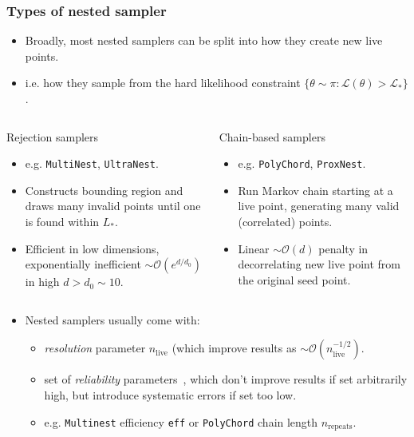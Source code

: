 \documentclass[aspectratio=169]{beamer}
\begin{document}
\begin{frame}
    \frametitle{Types of nested sampler}
    \begin{itemize}
        \item Broadly, most nested samplers can be split into how they create new live points.
        \item i.e. how they sample from the hard likelihood constraint $\{\theta\sim \pi : \mathcal{L}(\theta)>\mathcal{L}_* \}$.
    \end{itemize}
    \vspace{-10pt}
    \begin{columns}[t]
        \begin{block}{Rejection samplers}
            \begin{itemize}
                \item e.g. \texttt{MultiNest}, \texttt{UltraNest}.
                \item Constructs bounding region and draws many invalid points until one is found within $L_*$.
                \item Efficient in low dimensions, exponentially inefficient $\sim\mathcal{O}(e^{d/d_0})$ in high  $d>d_0\sim10$.
            \end{itemize}
        \end{block}
        \begin{block}{Chain-based samplers}
            \begin{itemize}
                \item e.g. \texttt{PolyChord}, \texttt{ProxNest}.
                \item Run Markov chain starting at a live point, generating many valid (correlated) points.
                \item Linear $\sim\mathcal{O}(d)$ penalty in decorrelating new live point from the original seed point.
            \end{itemize}
        \end{block}
    \end{columns}
    \vspace{15pt}
    \begin{itemize}
        \item Nested samplers usually come with:
            \begin{itemize}
                \item \emph{resolution} parameter $n_\text{live}$ (which improve results as $\sim\mathcal{O}(n_\text{live}^{-1/2})$.
                    \item set of \emph{reliability} parameters~, which don't improve results if set arbitrarily high, but introduce systematic errors if set too low.
                    \item e.g. \texttt{Multinest} efficiency \texttt{eff} or \texttt{PolyChord} chain length $n_\text{repeats}$.
            \end{itemize}
    \end{itemize}
\end{frame}
\end{document}
